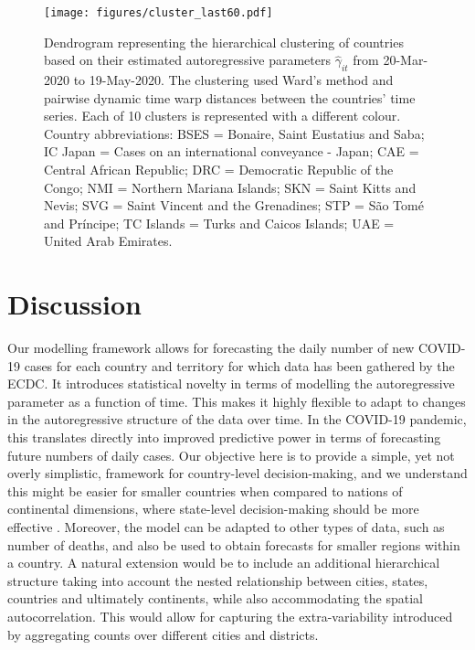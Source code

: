 \documentclass[fleqn,10pt]{wlscirep}
\begin{document}
\begin{figure}[ht!]
    \centering
    \texttt{[image: figures/cluster\_last60.pdf]}
    \caption{Dendrogram representing the hierarchical clustering of countries based on their estimated autoregressive parameters $\hat\gamma_{it}$ from 20-Mar-2020 to 19-May-2020. The clustering used Ward's method and pairwise dynamic time warp distances between the countries' time series. Each of 10 clusters is represented with a different colour. Country abbreviations: BSES = Bonaire, Saint Eustatius and Saba; IC Japan = Cases on an international conveyance - Japan; CAE = Central African Republic; DRC = Democratic Republic of the Congo; NMI = Northern Mariana Islands; SKN = Saint Kitts and Nevis; SVG = Saint Vincent and the Grenadines; STP = S\~ao Tom\'e and Pr\'incipe; TC Islands = Turks and Caicos Islands; UAE = United Arab Emirates.}
    \label{fig:cluster}
\end{figure}

\section*{Discussion}

Our modelling framework allows for forecasting the daily number of new COVID-19 cases for each country and territory for which data has been gathered by the ECDC. It introduces statistical novelty in terms of modelling the autoregressive parameter as a function of time. This makes it highly flexible to adapt to changes in the autoregressive structure of the data over time. In the COVID-19 pandemic, this translates directly into improved predictive power in terms of forecasting future numbers of daily cases. Our objective here is to provide a simple, yet not overly simplistic, framework for country-level decision-making, and we understand this might be easier for smaller countries when compared to nations of continental dimensions, where state-level decision-making should be more effective \cite{White2020}. Moreover, the model can be adapted to other types of data, such as number of deaths, and also be used to obtain forecasts for smaller regions within a country. A natural extension would be to include an additional hierarchical structure taking into account the nested relationship between cities, states, countries and ultimately continents, while also accommodating the spatial autocorrelation. This would allow for capturing the extra-variability introduced by aggregating counts over different cities and districts.
\end{document}
